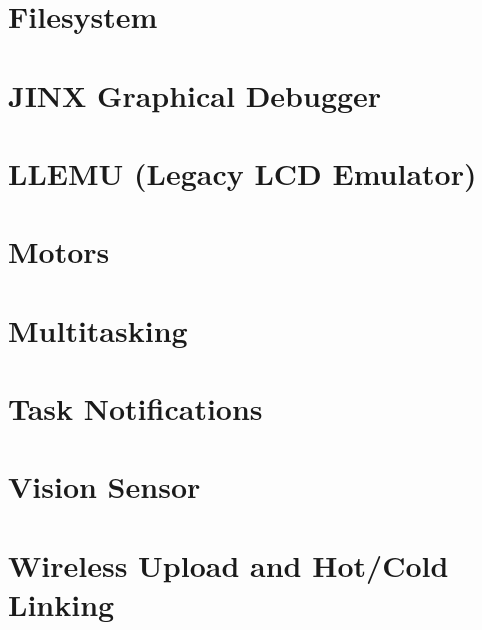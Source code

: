\documentclass[twoside]{book}
\newcommand{\+}{\discretionary{\mbox{\scriptsize$\hookleftarrow$}}{}{}}
\begin{document}
\chapter{Filesystem}
\label{md_docs_tutorials_topical_filesystem}

\chapter{J\+I\+NX Graphical Debugger}
\label{md_docs_tutorials_topical_jinx}

\chapter{L\+L\+E\+MU (Legacy L\+CD Emulator)}
\label{md_docs_tutorials_topical_llemu}

\chapter{Motors}
\label{md_docs_tutorials_topical_motors}

\chapter{Multitasking}
\label{md_docs_tutorials_topical_multitasking}

\chapter{Task Notifications}
\label{md_docs_tutorials_topical_notifications}

\chapter{Vision Sensor}
\label{md_docs_tutorials_topical_vision}

\chapter{Wireless Upload and Hot/\+Cold Linking}
\label{md_docs_tutorials_topical_wireless-upload}

\end{document}
